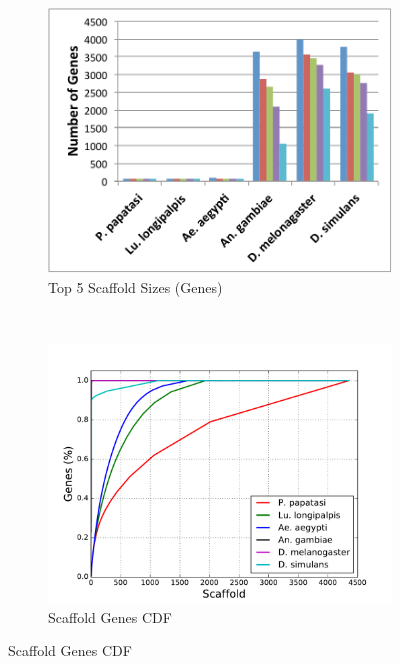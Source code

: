 \begin{figure}[H]
\begin{subfigure}[b]{0.45\textwidth}
    \includegraphics[width=\textwidth]{figures/synteny/top5_scaffold_sizes.pdf}
    \caption{Top 5 Scaffold Sizes (Genes)}
  \end{subfigure}
  ~
  \begin{subfigure}[b]{0.45\textwidth}
    \includegraphics[width=\textwidth]{figures/synteny/gene_scaffold_cdf.pdf}
    \caption{Scaffold Genes CDF}
  \end{subfigure}
  \label{fig:scaffolds}
\end{figure}


